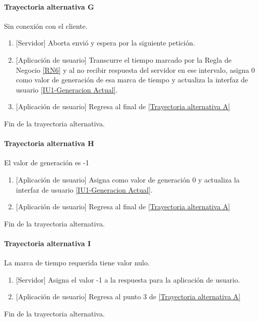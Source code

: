 \paragraph{Trayectoria alternativa G} \label{SUB-U-CU1.5:TG}
	Sin conexión con el cliente.
	\begin{enumerate}[label=G\arabic*.]
		\item {[Servidor]} Aborta envió y espera por la siguiente petición.
		\item {[Aplicación de usuario]} Transcurre el tiempo marcado por la Regla de Negocio \ref{RN6} y al no recibir respuesta del servidor en ese intervalo, asigna 0 como valor de generación de esa marca de tiempo y actualiza la interfaz de usuario \hyperref[fig:monitoreo]{[IU1-Generacion Actual]}.
		\item {[Aplicación de usuario]} Regresa al final de \hyperref[SUB-U-CU1.5:TA]{[Trayectoria alternativa A]}
	\end{enumerate}
	Fin de la trayectoria alternativa.
	
\paragraph{Trayectoria alternativa H} \label{SUB-U-CU1.5:TH}
	El valor de generación es -1
	\begin{enumerate}[label=H\arabic*.]
		\item {[Aplicación de usuario]} Asigna como valor de generación 0 y actualiza la interfaz de usuario \hyperref[fig:monitoreo]{[IU1-Generacion Actual]}.
		\item {[Aplicación de usuario]} Regresa al final de \hyperref[SUB-U-CU1.5:TA]{[Trayectoria alternativa A]}
	\end{enumerate}
	Fin de la trayectoria alternativa.

\paragraph{Trayectoria alternativa I} \label{SUB-U-CU1.5:TI}
	La marca de tiempo requerida tiene valor nulo.
	\begin{enumerate}[label=I\arabic*.]
		\item {[Servidor]} Asigna el valor -1 a la respuesta para la aplicación de usuario.
		\item {[Aplicación de usuario]} Regresa al punto 3 de \hyperref[SUB-U-CU1.5:TP]{[Trayectoria alternativa A]}
	\end{enumerate}
	Fin de la trayectoria alternativa.


